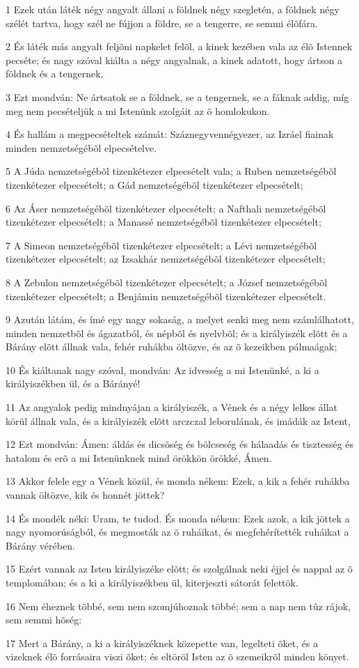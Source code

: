 \par 1 Ezek után láték négy angyalt állani a földnek négy szegletén, a földnek négy szélét tartva, hogy szél ne fújjon a földre, se a tengerre, se semmi élõfára.
\par 2 És láték más angyalt feljõni napkelet felõl, a kinek kezében vala az élõ Istennek pecséte; és nagy szóval kiálta a négy angyalnak, a kinek adatott, hogy ártson a földnek és a tengernek,
\par 3 Ezt mondván: Ne ártsatok se a földnek, se a tengernek, se a fáknak addig, míg meg nem pecsételjük a mi Istenünk szolgáit az õ homlokukon.
\par 4 És hallám a megpecsételtek számát: Száznegyvennégyezer, az Izráel fiainak minden nemzetségébõl elpecsételve.
\par 5 A Júda nemzetségébõl tizenkétezer elpecsételt vala; a Ruben nemzetségébõl tizenkétezer elpecsételt; a Gád nemzetségébõl tizenkétezer elpecsételt;
\par 6 Az Áser nemzetségébõl tizenkétezer elpecsételt; a Nafthali nemzetségébõl tizenkétezer elpecsételt; a Manassé nemzetségébõl tizenkétezer elpecsételt;
\par 7 A Simeon nemzetségébõl tizenkétezer elpecsételt; a Lévi nemzetségébõl tizenkétezer elpecsételt; az Izsakhár nemzetségébõl tizenkétezer elpecsételt;
\par 8 A Zebulon nemzetségébõl tizenkétezer elpecsételt; a József nemzetségébõl tizenkétezer elpecsételt; a Benjámin nemzetségébõl tizenkétezer elpecsételt.
\par 9 Azután látám, és ímé egy nagy sokaság, a melyet senki meg nem számlálhatott, minden nemzetbõl és ágazatból, és népbõl és nyelvbõl; és a királyiszék elõtt és a Bárány elõtt állnak vala, fehér ruhákba  öltözve, és az õ kezeikben pálmaágak;
\par 10 És kiáltanak nagy szóval, mondván: Az idvesség a mi Istenünké, a ki a királyiszékben ül, és a Bárányé!
\par 11 Az angyalok pedig mindnyájan a királyiszék, a Vének és a négy lelkes állat körül állnak vala, és a királyiszék elõtt arczczal leborulának, és imádák az Istent,
\par 12 Ezt mondván: Ámen: áldás és dicsõség és bölcseség és hálaadás és tisztesség és hatalom és erõ a mi Istenünknek mind örökkön örökké, Ámen.
\par 13 Akkor felele egy a Vének közül, és monda nékem: Ezek, a kik a fehér ruhákba vannak öltözve, kik és honnét jöttek?
\par 14 És mondék néki: Uram, te tudod. És monda nékem: Ezek azok, a kik jöttek a nagy nyomorúságból, és megmosták az õ ruháikat, és megfehérítették ruháikat a Bárány vérében.
\par 15 Ezért vannak az Isten királyiszéke elõtt; és szolgálnak neki éjjel és nappal az õ templomában; és a ki a királyiszékben ül, kiterjeszti sátorát felettök.
\par 16 Nem éheznek többé, sem nem szomjúhoznak többé; sem a nap  nem tûz rájok, sem semmi hõség:
\par 17 Mert a Bárány, a ki a királyiszéknek közepette van, legelteti õket, és a vizeknek élõ forrásaira viszi õket; és eltöröl Isten az õ szemeikrõl minden könyet.

